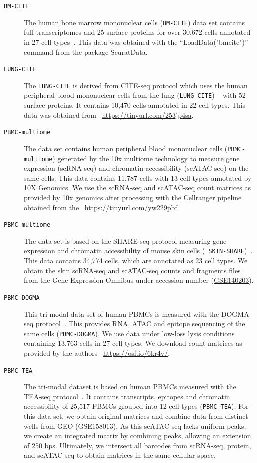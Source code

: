 \begin{description}
	\item[{\texttt{BM-CITE}}]
	The human bone marrow mononuclear cells ({\texttt{BM-CITE}}) data set contains full transcriptomes and 25 surface proteins for over 30,672 cells annotated in 27 cell types~\citep{hao2021seurat4}. This data was obtained with the ``LoadData("bmcite")'' command from the package SeuratData. 

	\item[{\texttt{LUNG-CITE}}]
	The \texttt{LUNG-CITE} is derived from CITE-seq protocol which uses the human peripheral blood mononuclear cells from the lung ({\texttt{LUNG-CITE}}) ~\citep{buus2021improving} with 52 surface proteins. It contains 10,470 cells annotated in 22 cell types. This data was obtained from ~\url{https://tinyurl.com/253jp4sa}.

	\item[{\texttt{PBMC-multiome}}]
  	The data set contains human peripheral blood mononuclear cells ({\texttt{PBMC-multiome}}) generated by the 10x multiome technology to measure gene expression (scRNA-seq) and chromatin accessibility (scATAC-seq) on the same cells. This data contains 11,787 cells with 13 cell types annotated by 10X Genomics.  We use the scRNA-seq and scATAC-seq count matrices as provided by 10x genomics after processing with the Cellranger pipeline obtained from the ~\url{https://tinyurl.com/yw229pbf}.

	\item[{\texttt{PBMC-multiome}}]
	The data set is based on the SHARE-seq protocol measuring gene expression and chromatin accessibility of mouse skin cells ({\texttt{ SKIN-SHARE}})~\citep{ma2020chromatin}. This data contains 34,774 cells, which are annotated as 23 cell types. We obtain the skin scRNA-seq and scATAC-seq counts and fragments files from the Gene Expression Omnibus under accession number (\href{https://www.ncbi.nlm.nih.gov/geo/query/acc.cgi?acc=GSE140203}{GSE140203}).

	\item[{\texttt{PBMC-DOGMA}}]
	This tri-modal data set of human PBMCs is measured with the DOGMA-seq protocol~\citep{mimitou2021scalable}. This provides RNA, ATAC and epitope sequencing of the same cells ({\texttt{PBMC-DOGMA}}). We use data under low-loss lysis conditions containing 13,763 cells in 27 cell types. We download count matrices as provided by the authors ~\url{https://osf.io/6kr4v/}.

	\item[{\texttt{PBMC-TEA}}]
	The tri-modal dataset is based on human PBMCs measured with the TEA-seq protocol~\citep{swanson2021simultaneous}. It contains transcripts, epitopes and chromatin accessibility of 25,517 PBMCs grouped into 12 cell types ({\texttt{PBMC-TEA}}). For this data set, we obtain original matrices and combine data from distinct wells from GEO (GSE158013). As this scATAC-seq lacks uniform peaks, we create an integrated matrix by combining peaks, allowing an extension of 250 bps. Ultimately, we intersect all barcodes from scRNA-seq, protein, and scATAC-seq to obtain matrices in the same cellular space.
\end{description}

